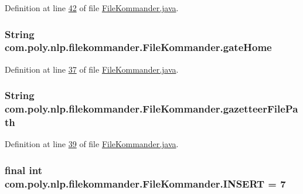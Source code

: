 Definition at line \hyperlink{L42}{42} of file \hyperlink{}{File\-Kommander.\-java}.

\hypertarget{classcom_1_1poly_1_1nlp_1_1filekommander_1_1_file_kommander_a4bdc4a5222eda1d37838da216256504e}{
\subsubsection[{gate\-Home}]{\setlength{\rightskip}{0pt plus 5cm}String com.\-poly.\-nlp.\-filekommander.\-File\-Kommander.\-gate\-Home\hspace{0.3cm}{\ttfamily [private]}}}\label{classcom_1_1poly_1_1nlp_1_1filekommander_1_1_file_kommander_a4bdc4a5222eda1d37838da216256504e}


Definition at line \hyperlink{L37}{37} of file \hyperlink{}{File\-Kommander.\-java}.

\hypertarget{classcom_1_1poly_1_1nlp_1_1filekommander_1_1_file_kommander_addc44216b38536fd6b1ade38a6c2abdc}{
\subsubsection[{gazetteer\-File\-Path}]{\setlength{\rightskip}{0pt plus 5cm}String com.\-poly.\-nlp.\-filekommander.\-File\-Kommander.\-gazetteer\-File\-Path\hspace{0.3cm}{\ttfamily [private]}}}\label{classcom_1_1poly_1_1nlp_1_1filekommander_1_1_file_kommander_addc44216b38536fd6b1ade38a6c2abdc}


Definition at line \hyperlink{L39}{39} of file \hyperlink{}{File\-Kommander.\-java}.

\hypertarget{classcom_1_1poly_1_1nlp_1_1filekommander_1_1_file_kommander_aea640bc0ab06be33089d86d4847bcfbd}{
\subsubsection[{I\-N\-S\-E\-R\-T}]{\setlength{\rightskip}{0pt plus 5cm}final int com.\-poly.\-nlp.\-filekommander.\-File\-Kommander.\-I\-N\-S\-E\-R\-T = 7\hspace{0.3cm}{\ttfamily [static]}}}\label{classcom_1_1poly_1_1nlp_1_1filekommander_1_1_file_kommander_aea640bc0ab06be33089d86d4847bcfbd}


